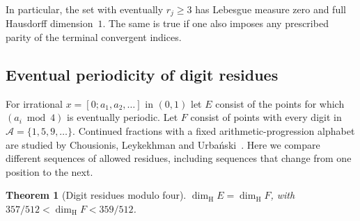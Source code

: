 \documentclass[11pt]{article}
\newtheorem{theorem}{Theorem}
\theoremstyle{definition}
\theoremstyle{remark}
\newcommand{\dimH}{\dim_{\mathrm{H}}}
\begin{document}
In particular, the set with eventually $r_j\ge3$ has Lebesgue
measure zero and full Hausdorff dimension~$1$. The same is true if one
also imposes any prescribed parity of the terminal convergent
indices.

\subsection{Eventual periodicity of digit residues}

For irrational $x=[0;a_1,a_2,\ldots]$ in $(0,1)$ let $E$ consist of
the points for which $(a_i\bmod4)$ is eventually periodic. Let $F$
consist of points with every digit in $\mathcal A=\{1,5,9,\ldots\}$.
Continued fractions with a fixed arithmetic-progression alphabet are
studied by Chousionis, Leykekhman and Urba\'nski~\cite{CLU}. Here
we compare different sequences of allowed residues, including sequences
that change from one position to the next.

\begin{theorem}[Digit residues modulo four]\label{thm:residues}
$\dimH E=\dimH F$, with $357/512<\dimH F<359/512$.
\end{theorem}
\end{document}
